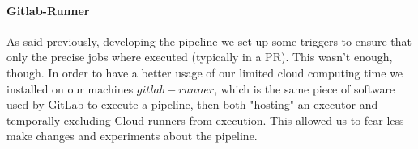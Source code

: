 \documentclass[a4paper,10pt]{scrartcl}
\begin{document}
\paragraph{Gitlab-Runner}

As said previously, developing the pipeline we set up some triggers to ensure that only the precise jobs where executed (typically in a PR). This wasn't enough, though. In order to have a better usage of our limited cloud computing time we installed on our machines $gitlab-runner$, which is the same piece of software used by GitLab to execute a pipeline, then both "hosting" an executor and temporally excluding Cloud runners from execution. This allowed us to fear-less make changes and experiments about the pipeline.
\end{document}
